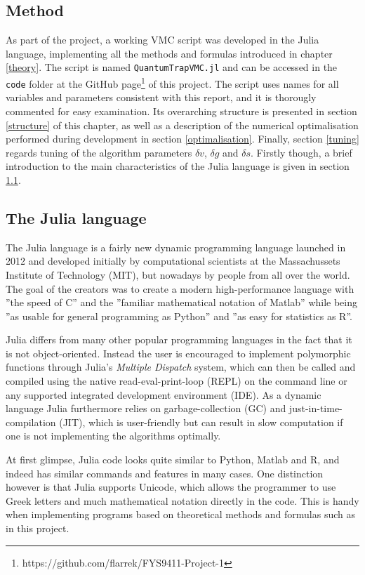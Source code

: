 \documentclass[a4paper,8pt]{article}
\begin{document}
\begin{multicols}{2}
\section{Method}\label{method}
As part of the project, a working VMC script was developed in the Julia language, implementing all the methods and formulas introduced in chapter \ref{theory}. The script is named \texttt{QuantumTrapVMC.jl} and can be accessed in the \texttt{code} folder at the GitHub page\footnote{https://github.com/flarrek/FYS9411-Project-1} of this project. The script uses names for all variables and parameters consistent with this report, and it is thorougly commented for easy examination. Its overarching structure is presented in section \ref{structure} of this chapter, as well as a description of the numerical optimalisation performed during development in section \ref{optimalisation}. Finally, section \ref{tuning} regards tuning of the algorithm parameters $\delta v$, $\delta g$ and $\delta s$. Firstly though, a brief introduction to the main characteristics of the Julia language is given in section \ref{Julia}.


\subsection{The Julia language}\label{Julia}
The Julia language is a fairly new dynamic programming language launched in 2012 and developed initially by computational scientists at the Massachussets Institute of Technology (MIT), but nowadays by people from all over the world. The goal of the creators was to create a modern high-performance language with ''the speed of C'' and the ''familiar mathematical notation of Matlab'' while being ''as usable for general programming as Python'' and ''as easy for statistics as R''.\cite{JuliaGoal}

Julia differs from many other popular programming languages in the fact that it is not object-oriented. Instead the user is encouraged to implement polymorphic functions through Julia's \textit{Multiple Dispatch} system, which can then be called and compiled using the native read-eval-print-loop (REPL) on the command line or any supported integrated development environment (IDE). As a dynamic language Julia furthermore relies on garbage-collection (GC) and just-in-time-compilation (JIT), which is user-friendly but can result in slow computation if one is not implementing the algorithms optimally.

At first glimpse, Julia code looks quite similar to Python, Matlab and R, and indeed has similar commands and features in many cases. One distinction however is that Julia supports Unicode, which allows the programmer to use Greek letters and much mathematical notation directly in the code. This is handy when implementing programs based on theoretical methods and formulas such as in this project.



\end{multicols}
\end{document}
